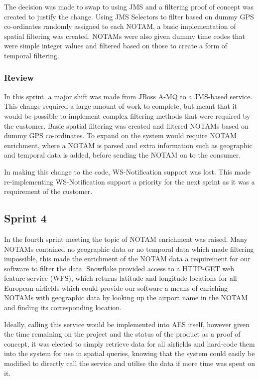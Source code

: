 \documentclass[a4paper, 12pt, twoside]{article}
\begin{document}
The decision was made to swap to using JMS and a filtering proof of concept was created to justify the change. Using JMS Selectors to filter based on dummy GPS co-ordinates randomly assigned to each NOTAM, a basic implementation of spatial filtering was created. NOTAMs were also given dummy time codes that were simple integer values and filtered based on those to create a form of temporal filtering.

\subsubsection{Review}

In this sprint, a major shift was made from JBoss A-MQ to a JMS-based service. This change required a large amount of work to complete, but meant that it would be possible to implement complex filtering methods that were required by the customer. Basic spatial filtering was created and filtered NOTAMs based on dummy GPS co-ordinates. To expand on the system would require NOTAM enrichment, where a NOTAM is parsed and extra information such as geographic and temporal data is added, before sending the NOTAM on to the consumer.

In making this change to the code, WS-Notification support was lost. This made re-implementing WS-Notification support a priority for the next sprint as it was a requirement of the customer.

\subsection{Sprint 4}
\label{sec:impl_sprint_4}

In the fourth sprint meeting the topic of NOTAM enrichment was raised. Many NOTAMs contained no geographic data or no temporal data which made filtering impossible, this made the enrichment of the NOTAM data a requirement for our software to filter the data. Snowflake provided access to a HTTP-GET web feature service (WFS), which returns latitude and longitude locations for all European airfields which could provide our software a means of enriching NOTAMs with geographic data by looking up the airport name in the NOTAM and finding its corresponding location.

Ideally, calling this service would be implemented into AES itself, however given the time remaining on the project and the status of the product as a proof of concept, it was elected to simply retrieve data for all airfields and hard-code them into the system for use in spatial queries, knowing that the system could easily be modified to directly call the service and utilise the data if more time was spent on it.
\end{document}
